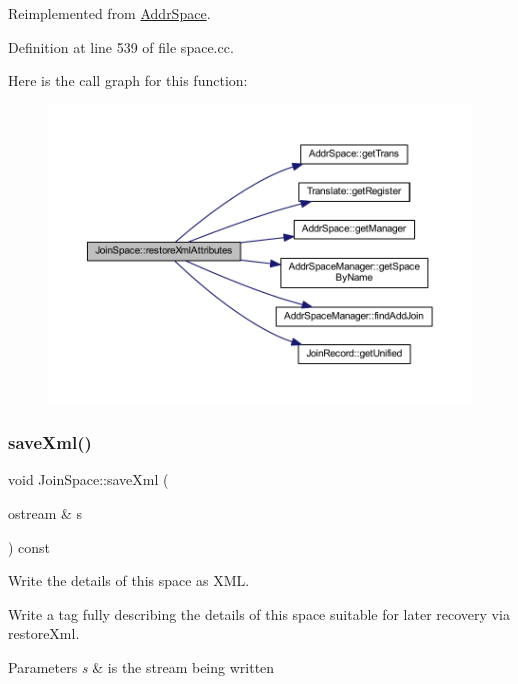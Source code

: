 Reimplemented from \mbox{\hyperlink{class_addr_space_aa20e53222697512db0a64db75179ead2}{Addr\+Space}}.



Definition at line 539 of file space.\+cc.

Here is the call graph for this function\+:
\nopagebreak
\begin{figure}[H]
\begin{center}
\leavevmode
\includegraphics[width=350pt]{class_join_space_aca1360dbe0abf4a9ace679887cb47c17_cgraph}
\end{center}
\end{figure}
\mbox{\label{class_join_space_a7e7bdd3347396ca62a465041f13e06a1}} 
\subsubsection{\texorpdfstring{saveXml()}{saveXml()}}
{\footnotesize\ttfamily void Join\+Space\+::save\+Xml (\begin{DoxyParamCaption}\item[{ostream \&}]{s }\end{DoxyParamCaption}) const\hspace{0.3cm}{\ttfamily [virtual]}}



Write the details of this space as X\+ML. 

Write a tag fully describing the details of this space suitable for later recovery via restore\+Xml. 
\begin{DoxyParams}{Parameters}
{\em s} & is the stream being written \\
\hline
\end{DoxyParams}



